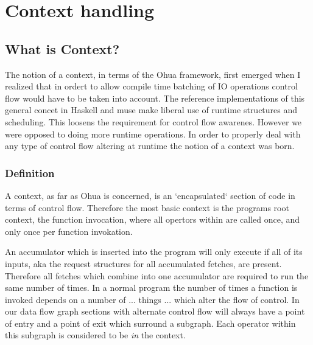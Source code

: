 
\chapter{Context handling} %

\label{ChapterContext} %


\section{What is Context?}

The notion of a context, in terms of the Ohua framework, first emerged when I realized that in ordert to allow compile time batching of IO operations control flow would have to be taken into account.
The reference implementations of this general concet in Haskell and muse make liberal use of runtime structures and scheduling.
This loosens the requirement for control flow awarenes.
However we were opposed to doing more runtime operations.
In order to properly deal with any type of control flow altering at runtime the notion of a context was born.

\subsection{Definition}

A context, as far as Ohua is concerned, is an `encapsulated` section of code in terms of control flow.
Therefore the most basic context is the programs root context, the function invocation, where all opertors within are called once, and only once per function invokation.


An accumulator which is inserted into the program will only execute if all of its inputs, aka the request structures for all accumulated fetches, are present.
Therefore all fetches which combine into one accumulator are required to run the same number of times.
In a normal program the number of times a function is invoked depends on a number of ... things ... which alter the flow of control.
In our data flow graph sections with alternate control flow will always have a point of entry and a point of exit which surround a subgraph.
Each operator within this subgraph is considered to be \textit{in} the context.


